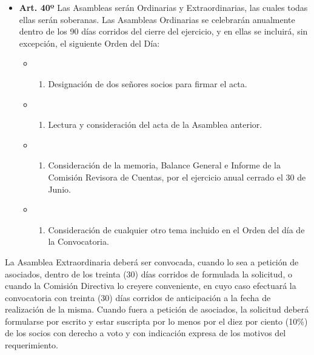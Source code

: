 \documentclass[openany]{book}
\providecommand{\tightlist}{%
  \setlength{\itemsep}{0pt}\setlength{\parskip}{0pt}}
\begin{document}
\begin{itemize}
\tightlist
\item
  \textbf{Art. 40º}
  Las Asambleas serán Ordinarias y Extraordinarias, las cuales todas ellas serán soberanas. Las Asambleas Ordinarias se celebrarán anualmente dentro de los 90 días corridos del cierre del ejercicio, y en ellas se incluirá, sin excepción, el siguiente Orden del Día:

  \begin{itemize}
  \item
    \begin{enumerate}
    \def\labelenumi{\alph{enumi})}
    \tightlist
    \item
      Designación de dos señores socios para firmar el acta.
    \end{enumerate}
  \item
    \begin{enumerate}
    \def\labelenumi{\alph{enumi})}
    \setcounter{enumi}{1}
    \tightlist
    \item
      Lectura y consideración del acta de la Asamblea anterior.
    \end{enumerate}
  \item
    \begin{enumerate}
    \def\labelenumi{\alph{enumi})}
    \setcounter{enumi}{2}
    \tightlist
    \item
      Consideración de la memoria, Balance General e Informe de la Comisión Revisora de Cuentas, por el ejercicio anual cerrado el 30 de Junio.
    \end{enumerate}
  \item
    \begin{enumerate}
    \def\labelenumi{\alph{enumi})}
    \setcounter{enumi}{3}
    \tightlist
    \item
      Consideración de cualquier otro tema incluido en el Orden del día de la Convocatoria.
    \end{enumerate}
  \end{itemize}
\end{itemize}

La Asamblea Extraordinaria deberá ser convocada, cuando lo sea a petición de asociados, dentro de los treinta (30) días corridos de formulada la solicitud, o cuando la Comisión Directiva lo creyere conveniente, en cuyo caso efectuará la convocatoria con treinta (30) días corridos de anticipación a la fecha de realización de la misma. Cuando fuera a petición de asociados, la solicitud deberá formularse por escrito y estar suscripta por lo menos por el diez por ciento (10\%) de los socios con derecho a voto y con indicación expresa de los motivos del requerimiento.
\end{document}
